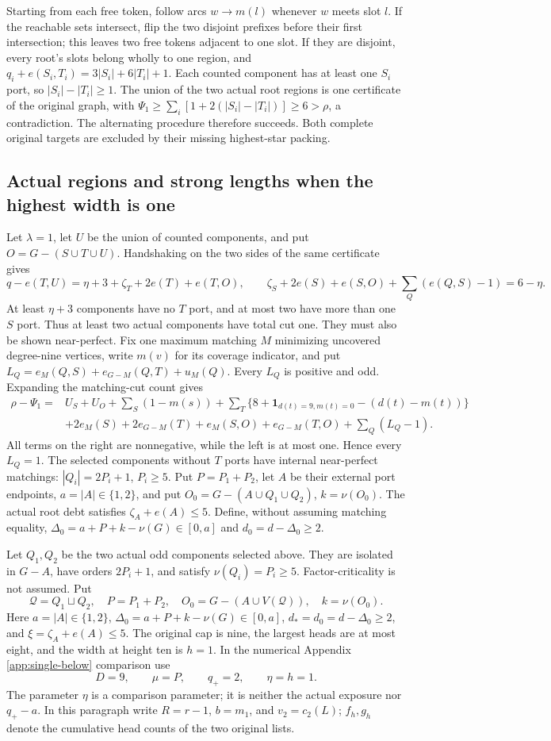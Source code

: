 \documentclass[11pt,a4paper]{article}
\theoremstyle{definition}
\begin{document}
Starting from each free token, follow arcs $w\to m(l)$ whenever $w$ meets slot $l$. If the reachable sets intersect, flip the two disjoint prefixes before their first intersection; this leaves two free tokens adjacent to one slot. If they are disjoint, every root's slots belong wholly to one region, and
$q_i+e(S_i,T_i)=3|S_i|+6|T_i|+1$.
Each counted component has at least one $S_i$ port, so $|S_i|-|T_i|\ge1$. The union of the two actual root regions is one certificate of the original graph, with
$\Psi_1\ge\sum_i[1+2(|S_i|-|T_i|)]\ge6>\rho$, a contradiction.
The alternating procedure therefore succeeds. Both complete original targets are excluded by their missing highest-star packing.
\subsection{Actual regions and strong lengths when the highest width is one}
Let $\lambda=1$, let $U$ be the union of counted components, and put $O=G-(S\cup T\cup U)$. Handshaking on the two sides of the same certificate gives
\[
q-e(T,U)=\eta+3+\zeta_T+2e(T)+e(T,O),\qquad
\zeta_S+2e(S)+e(S,O)+\sum_Q(e(Q,S)-1)=6-\eta.
\]
At least $\eta+3$ components have no $T$ port, and at most two have more than one $S$ port. Thus at least two actual components have total cut one.
They must also be shown near-perfect. Fix one maximum matching $M$ minimizing uncovered degree-nine vertices, write $m(v)$ for its coverage indicator, and put
$L_Q=e_M(Q,S)+e_{G-M}(Q,T)+u_M(Q)$.
Every $L_Q$ is positive and odd. Expanding the matching-cut count gives
\begin{align*}
\rho-\Psi_1={}&U_S+U_O+\sum_{S}(1-m(s))+\sum_T
\{8+\mathbf1_{d(t)=9,m(t)=0}-(d(t)-m(t))\}\\
&+2e_M(S)+2e_{G-M}(T)+e_M(S,O)+e_{G-M}(T,O)
+\sum_Q(L_Q-1).
\end{align*}
All terms on the right are nonnegative, while the left is at most one. Hence every $L_Q=1$. The selected components without $T$ ports have internal near-perfect matchings:
$|Q_i|=2P_i+1$, $P_i\ge5$. Put $P=P_1+P_2$, let $A$ be their external port endpoints, $a=|A|\in\{1,2\}$, and put
$O_0=G-(A\cup Q_1\cup Q_2)$, $k=\nu(O_0)$.
The actual root debt satisfies $\zeta_A+e(A)\le5$.
Define, without assuming matching equality,
$\Delta_0=a+P+k-\nu(G)\in[0,a]$ and $d_0=d-\Delta_0\ge2$.

Let \(Q_1,Q_2\) be the two actual odd components selected above. They are isolated in \(G-A\), have orders \(2P_i+1\), and satisfy
\(\nu(Q_i)=P_i\ge5\). Factor-criticality is not assumed.
Put
\[
\mathcal Q=Q_1\sqcup Q_2,\quad P=P_1+P_2,\quad
O_0=G-(A\cup V(\mathcal Q)),\quad k=\nu(O_0).
\]
Here \(a=|A|\in\{1,2\}\),
\(\Delta_0=a+P+k-\nu(G)\in[0,a]\),
\(d_*=d_0=d-\Delta_0\ge2\), and
\(\xi=\zeta_A+e(A)\le5\).
The original cap is nine, the largest heads are at most eight, and the width at height ten is \(h=1\).
In the numerical Appendix \ref{app:single-below} comparison use
\[
D=9,\qquad \mu=P,\qquad q_+=2,\qquad \eta=h=1.
\]
The parameter \(\eta\) is a comparison parameter; it is neither the actual exposure nor \(q_+-a\).
In this paragraph write \(R=r-1\), \(b=m_1\), and \(v_2=c_2(L)\); \(f_h,g_h\) denote the cumulative head counts of the two original lists.
\end{document}
